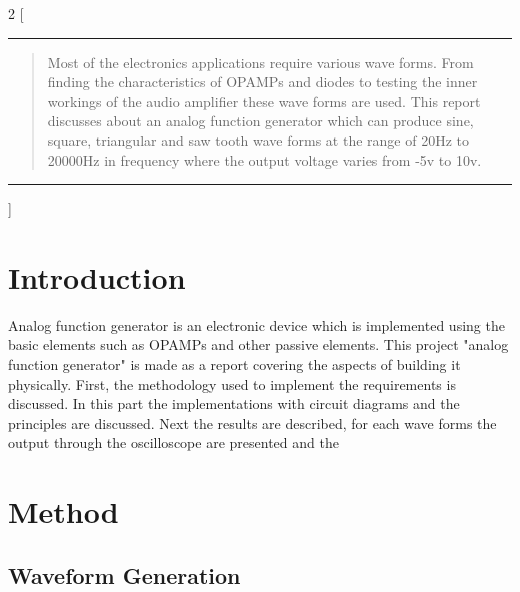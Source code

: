 \documentclass[11pt]{article}
\begin{document}
\begin{multicols}{2}
[
\rule{\textwidth}{0.5pt}
\begin{abstract}
    Most of the electronics applications require various wave forms. From finding the characteristics of OPAMPs and diodes to testing the inner workings of the audio amplifier these wave forms are used. This report discusses about an analog function generator which can produce sine, square, triangular and saw tooth wave forms at the range of 20Hz to 20000Hz in frequency where the output voltage varies from -5v to 10v.
\end{abstract}
\rule{\textwidth}{0.5pt}
]
\tableofcontents

\section{Introduction}
Analog function generator is an electronic device which is implemented using the basic elements such as OPAMPs and other passive elements. This project "analog function generator" is made as a report covering the aspects of building it physically. First, the methodology used to implement the requirements is discussed. In this part the implementations with circuit diagrams and the principles are discussed. Next the results are described, for each wave forms the output through the oscilloscope are presented and the 


\section{Method}

\subsection{Waveform Generation}


\end{multicols}
\end{document}
